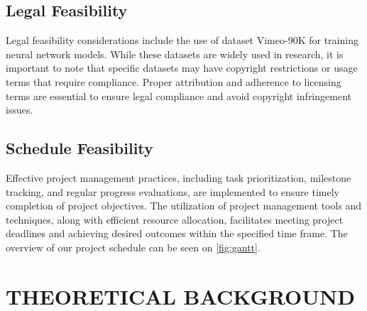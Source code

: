 \documentclass{ioereport}
\begin{document}
    \subsection{Legal Feasibility}
    Legal feasibility considerations include the use of dataset Vimeo-90K for training neural network models. While these datasets are widely used in research, it is important to note that specific datasets may have copyright restrictions or usage terms that require compliance. Proper attribution and adherence to licensing terms are essential to ensure legal compliance and avoid copyright infringement issues.
    \subsection{Schedule Feasibility}
    Effective project management practices, including task prioritization, milestone tracking, and regular progress evaluations, are implemented to ensure timely completion of project objectives. The utilization of project management tools and techniques, along with efficient resource allocation, facilitates meeting project deadlines and achieving desired outcomes within the specified time frame. The overview of our project schedule can be seen on \autoref{fig:gantt}.
\pagebreak

\section{\MakeUppercase{Theoretical Background}}
\end{document}
